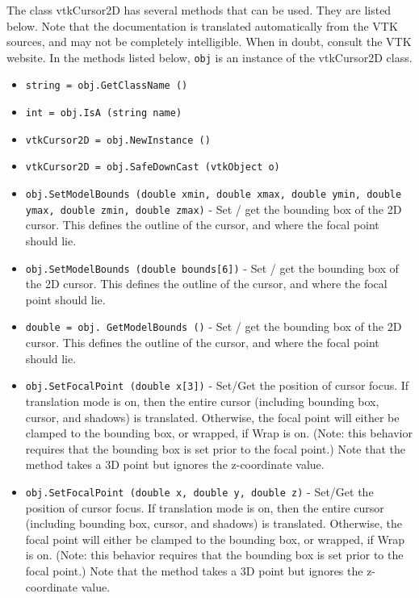 The class vtkCursor2D has several methods that can be used.
  They are listed below.
Note that the documentation is translated automatically from the VTK sources,
and may not be completely intelligible.  When in doubt, consult the VTK website.
In the methods listed below, \verb|obj| is an instance of the vtkCursor2D class.
\begin{itemize}
\item  \verb|string = obj.GetClassName ()|

\item  \verb|int = obj.IsA (string name)|

\item  \verb|vtkCursor2D = obj.NewInstance ()|

\item  \verb|vtkCursor2D = obj.SafeDownCast (vtkObject o)|

\item  \verb|obj.SetModelBounds (double xmin, double xmax, double ymin, double ymax, double zmin, double zmax)| -  Set / get the bounding box of the 2D cursor. This defines the outline
 of the cursor, and where the focal point should lie.

\item  \verb|obj.SetModelBounds (double bounds[6])| -  Set / get the bounding box of the 2D cursor. This defines the outline
 of the cursor, and where the focal point should lie.

\item  \verb|double = obj. GetModelBounds ()| -  Set / get the bounding box of the 2D cursor. This defines the outline
 of the cursor, and where the focal point should lie.

\item  \verb|obj.SetFocalPoint (double x[3])| -  Set/Get the position of cursor focus. If translation mode is on,
 then the entire cursor (including bounding box, cursor, and shadows)
 is translated. Otherwise, the focal point will either be clamped to the
 bounding box, or wrapped, if Wrap is on. (Note: this behavior requires
 that the bounding box is set prior to the focal point.) Note that the 
 method takes a 3D point but ignores the z-coordinate value.

\item  \verb|obj.SetFocalPoint (double x, double y, double z)| -  Set/Get the position of cursor focus. If translation mode is on,
 then the entire cursor (including bounding box, cursor, and shadows)
 is translated. Otherwise, the focal point will either be clamped to the
 bounding box, or wrapped, if Wrap is on. (Note: this behavior requires
 that the bounding box is set prior to the focal point.) Note that the 
 method takes a 3D point but ignores the z-coordinate value.


\end{itemize}
